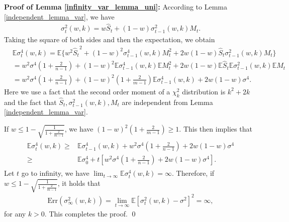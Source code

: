 \noindent
\textbf{Proof of Lemma \ref{infinity_var_lemma_uni}:} According to Lemma \ref{independent_lemma_var}, we have
\begin{align*}
\sigma_t^2(w,k)=w \widehat{S}_t+(1-w)\sigma_{t-1}^2(w,k) M_t.
\end{align*}
Taking the square of both sides and then the expectation, we obtain
\begin{align*}
& \mathbb{E}\sigma_t^4(w,k)=\mathbb{E}\{w^2 {\widehat{S}_t}^2+(1-w)^2\sigma_{t-1}^4(w,k) M_t^2+2w(1-w)\widehat{S}_t\sigma_{t-1}^2(w,k) M_t\}\\ &=w^2\sigma^4 \left(1+\frac{2}{n-1}\right)+(1-w)^2\mathbb{E}\sigma_{t-1}^4(w,k)\mathbb{E}M_t^2+2w(1-w)\mathbb{E}\widehat{S}_t\mathbb{E}\sigma_{t-1}^2(w,k)\mathbb{E}M_t \\
&=w^2\sigma^4 \left(1+\frac{2}{n-1}\right)+(1-w)^2\left(1+\frac{2}{m-1}\right)\mathbb{E}\sigma_{t-1}^4(w,k)+2w(1-w)\sigma^4.
\end{align*}
Here we use a fact that the second order moment of a $\chi^2_k$ distribution is $k^2+2k$ and the fact that $\widehat{S}_t,\sigma_{t-1}^2(w,k),M_t$ are independent from Lemma \ref{independent_lemma_var}.

If $w\leq 1-\sqrt{\frac{1}{1+\frac{2}{m-1}}}$, we have $(1-w)^2(1+\frac{2}{m-1})\geq 1$. This then implies that
\begin{align}
\begin{split}
\label{uni_var_infintiy_proof}
    \mathbb{E}\sigma_t^4(w,k) \geq & \mathbb{E}\sigma_{t-1}^4(w,k)+w^2\sigma^4 \left(1+\frac{2}{n-1}\right)+2w(1-w)\sigma^4 \\
    \geq & \mathbb{E}\sigma_{0}^4+t\left[w^2\sigma^4 \left(1+\frac{2}{n-1}\right)+2w(1-w)\sigma^4\right].
\end{split}
\end{align}
Let $t$ go to infinity, we have $\lim_{t \to \infty}\mathbb{E}\sigma_t^4(w,k)=\infty$. Therefore, if $w\leq 1-\sqrt{\frac{1}{1+\frac{2}{m-1}}}$, it holds that
\begin{align}
\mathrm{Err}(\sigma_{\infty}^2(w,k)) =\lim_{t\to \infty}\mathbb{E}[\sigma_t^2(w,k)-\sigma^2]^2=\infty,
\end{align}
for any $k >0$. This completes the proof. \qed

